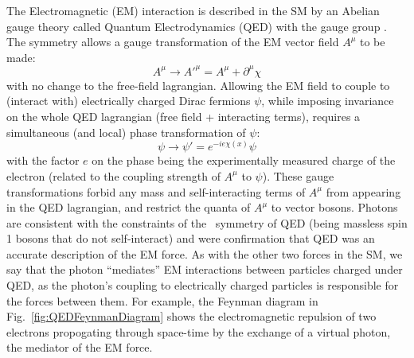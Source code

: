 
The Electromagnetic (EM) interaction is described in the SM by an Abelian gauge theory called Quantum Electrodynamics (QED) with the gauge group \Uone. The \Uone symmetry allows a gauge transformation of the EM vector field $A^{\mu}$ to be made:
\begin{equation}
    A^{\mu} \rightarrow A'^{\mu} = A^{\mu} + \partial^{\mu}\chi
\end{equation}
with no change to the free-field lagrangian. Allowing the EM field to couple to (interact with) electrically charged Dirac fermions $\psi$, while imposing invariance on the whole QED lagrangian (free field + interacting terms), requires a simultaneous (and local) phase transformation of $\psi$:
\begin{equation}
    \psi \rightarrow \psi' = e^{-ie\chi(x)}\psi
\end{equation}
with the factor $e$ on the phase being the experimentally measured charge of the electron (related to the coupling strength of $A^{\mu}$ to $\psi$). These gauge transformations forbid any mass and self-interacting terms of $A^{\mu}$ from appearing in the QED lagrangian, and restrict the quanta of $A^{\mu}$ to vector bosons. Photons are consistent with the constraints of the \Uone~symmetry of QED (being massless spin 1 bosons that do not self-interact) and were confirmation that QED was an accurate description of the EM force. As with the other two forces in the SM, we say that the photon ``mediates'' EM interactions between particles charged under QED, as the photon's coupling to electrically charged particles is responsible for the forces between them. For example, the Feynman diagram in Fig.~\ref{fig:QEDFeynmanDiagram} shows the electromagnetic repulsion of two electrons propogating through space-time by the exchange of a virtual photon, the mediator of the EM force. 
